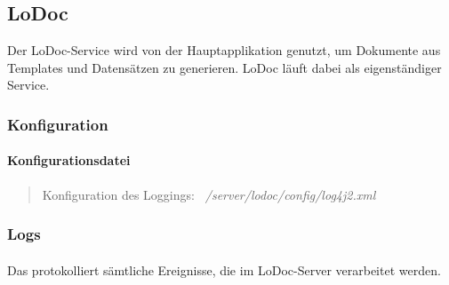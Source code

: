 \subsection{LoDoc}

Der LoDoc-Service wird von der Hauptapplikation genutzt, um Dokumente aus Templates und Datensätzen zu generieren.  
LoDoc läuft dabei als eigenständiger Service.

\subsubsection{Konfiguration}

\paragraph{Konfigurationsdatei}
\vspace{0.5em}
\begin{quote}
Konfiguration des Loggings: \textit{~/server/lodoc/config/log4j2.xml}
\end{quote}

\subsubsection{Logs}

\paragraph{\lodocServerLog}
Das \texttt{\lodocServerLog} protokolliert sämtliche Ereignisse, die im LoDoc-Server verarbeitet werden.